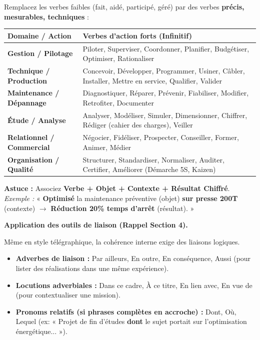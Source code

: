 \documentclass[11pt]{article}
\newcommand{\cle}[1]{{\popxbold\color{popdark}#1}}
\begin{document}
\begin{exemplebox}
Remplacez les verbes faibles (fait, aidé, participé, géré) par des verbes \textbf{précis, mesurables, techniques} :
\begin{center}
\begin{tabularx}{\linewidth}{|l|X|}\hline
\rowcolor{popblueL}
\textbf{Domaine / Action} & \textbf{Verbes d'action forts (Infinitif)} \\ \hline
\textbf{Gestion / Pilotage} & \cle{Piloter}, \cle{Superviser}, \cle{Coordonner}, \cle{Planifier}, \cle{Budgétiser}, \cle{Optimiser}, \cle{Rationaliser} \\ \hline
\textbf{Technique / Production} & \cle{Concevoir}, \cle{Développer}, \cle{Programmer}, \cle{Usiner}, \cle{Câbler}, \cle{Installer}, \cle{Mettre en service}, \cle{Qualifier}, \cle{Valider} \\ \hline
\textbf{Maintenance / Dépannage} & \cle{Diagnostiquer}, \cle{Réparer}, \cle{Prévenir}, \cle{Fiabiliser}, \cle{Modifier}, \cle{Retrofiter}, \cle{Documenter} \\ \hline
\textbf{Étude / Analyse} & \cle{Analyser}, \cle{Modéliser}, \cle{Simuler}, \cle{Dimensionner}, \cle{Chiffrer}, \cle{Rédiger (cahier des charges)}, \cle{Veiller} \\ \hline
\textbf{Relationnel / Commercial} & \cle{Négocier}, \cle{Fidéliser}, \cle{Prospecter}, \cle{Conseiller}, \cle{Former}, \cle{Animer}, \cle{Médier} \\ \hline
\textbf{Organisation / Qualité} & \cle{Structurer}, \cle{Standardiser}, \cle{Normaliser}, \cle{Auditer}, \cle{Certifier}, \cle{Améliorer (Démarche 5S, Kaizen)} \\ \hline
\end{tabularx}
\end{center}
\textbf{Astuce :} Associez \textbf{Verbe + Objet + Contexte + Résultat Chiffré}.
\emph{Exemple :} « \textbf{Optimisé} la maintenance préventive (objet) \textbf{sur presse 200T} (contexte) $\rightarrow$ \textbf{Réduction 20\% temps d'arrêt} (résultat). »
\end{exemplebox}

\textbf{Application des outils de liaison (Rappel Section 4).}\par
Même en style télégraphique, la cohérence interne exige des liaisons logiques.
\begin{itemize}
    \item \textbf{Adverbes de liaison :} \cle{Par ailleurs}, \cle{En outre}, \cle{En conséquence}, \cle{Aussi} (pour lister des réalisations dans une même expérience).
    \item \textbf{Locutions adverbiales :} \cle{Dans ce cadre}, \cle{À ce titre}, \cle{En lien avec}, \cle{En vue de} (pour contextualiser une mission).
    \item \textbf{Pronoms relatifs (si phrases complètes en accroche) :} \cle{Dont}, \cle{Où}, \cle{Lequel} (ex: « Projet de fin d'études \textbf{dont} le sujet portait sur l'optimisation énergétique... »).
\end{itemize}
\end{document}
